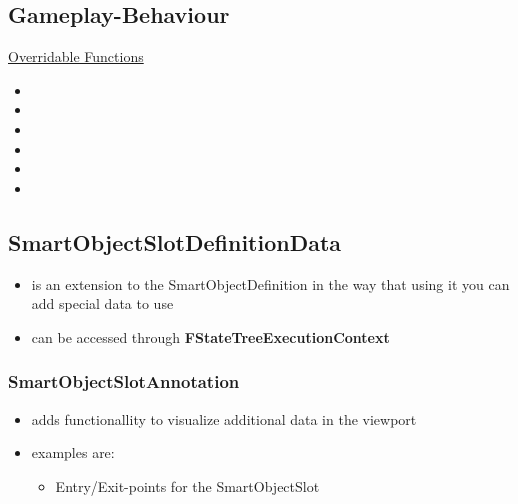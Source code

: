         \subsection{Gameplay-Behaviour}
            \uline{Overridable Functions}
            \begin{itemize}
                \item {}
                \item {}
                \item {}
                \item {}
                \item {}
                \item {}
            \end{itemize}


        \subsection{SmartObjectSlotDefinitionData}
            \begin{itemize}
                \item is an extension to the SmartObjectDefinition in the way that using it you can add special data to use
                \item can be accessed through \textbf{FStateTreeExecutionContext}
            \end{itemize}

            \subsubsection{SmartObjectSlotAnnotation}
                \begin{itemize}
                    \item adds functionallity to visualize additional data in the viewport
                    \item examples are:
                    \begin{itemize}
                        \item Entry/Exit-points for the SmartObjectSlot
                    \end{itemize}
                \end{itemize}




